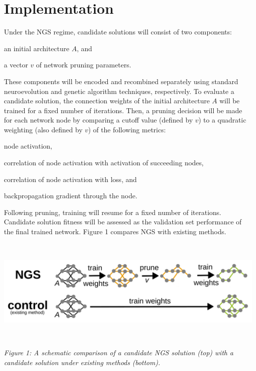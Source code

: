 \section{Implementation}

Under the NGS regime, candidate solutions will consist of two components:
\begin{enumerate*}[label=(\arabic*)]
\item an initial architecture $A$, and
\item a vector $v$ of network pruning parameters.
\end{enumerate*}
These components will be encoded and recombined separately using standard neuroevolution and genetic algorithm techniques, respectively.
To evaluate a candidate solution, the connection weights of the initial architecture $A$ will be trained for a fixed number of iterations.
Then, a pruning decision will be made for each network node by comparing a cutoff value (defined by $v$) to a quadratic weighting (also defined by $v$) of the following metrics:
\begin{enumerate*}[label=(\alph*)]
\item node activation,
\item correlation of node activation with activation of succeeding nodes,
\item correlation of node activation with loss, and
\item backpropagation gradient through the node.
\end{enumerate*}
Following pruning, training will resume for a fixed number of iterations. Candidate solution fitness will be assessed as the validation set performance of the final trained network.
Figure 1 compares NGS with existing methods.

\noindent
\begin{minipage}{0.05\textwidth}
~
\end{minipage}%
\begin{minipage}{0.58\textwidth}
 \includegraphics[width=\textwidth]{img/complete}
\end{minipage}%
\begin{minipage}{0.05\textwidth}
~
\end{minipage}%
\begin{minipage}{0.3\textwidth}
  {
  \begin{footnotesize}
    \textit{
   Figure 1: A schematic comparison of a candidate NGS solution (top) with a candidate solution under existing methods (bottom).
   }
  \end{footnotesize}
  \par}
\end{minipage}%
\begin{minipage}{0.06\textwidth}
~
\end{minipage}%

